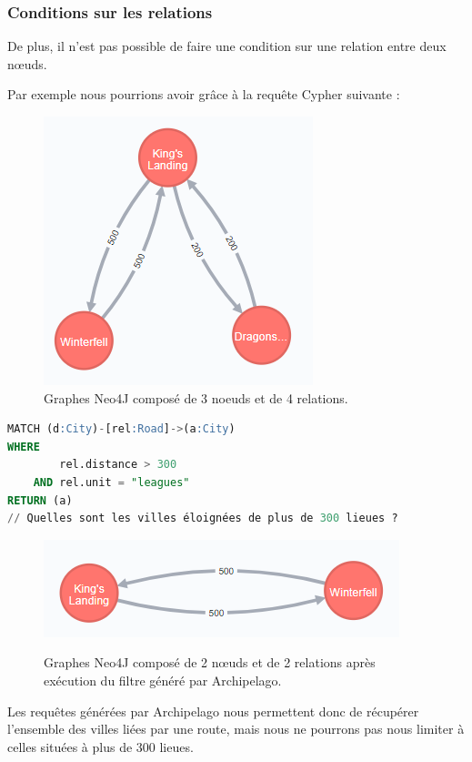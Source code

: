 \documentclass[a4paper,fleqn,12pt,oneside]{report}
\begin{document}
\subsubsection*{\bf Conditions sur les relations}
De plus, il n'est  pas possible de faire une condition sur une relation entre deux nœuds. 

Par exemple nous pourrions avoir grâce à la requête Cypher suivante : 

\begin{figure}[!ht]
\centering
\includegraphics[scale=0.8]{figures/citiesRel.png}
\caption{Graphes Neo4J composé de 3 noeuds et de 4 relations.}
\label{fig:citiesRel}
\end{figure}
 
\begin{lstlisting}[language=SQL]
MATCH (d:City)-[rel:Road]->(a:City)
WHERE
	    rel.distance > 300
	AND rel.unit = "leagues"
RETURN (a)
// Quelles sont les villes éloignées de plus de 300 lieues ?
\end{lstlisting} 


\begin{figure}[!ht]
\centering
\includegraphics[scale=0.8]{figures/citiesRelFilt.png}
\label{fig:citiesRelFilt}
\caption{Graphes Neo4J composé de 2 nœuds et de 2 relations après exécution du filtre généré par Archipelago.}
\end{figure}

Les requêtes générées par Archipelago nous permettent donc de récupérer l'ensemble des villes liées par une route, mais nous ne pourrons pas nous limiter à celles situées à plus de 300 lieues.
\end{document}
